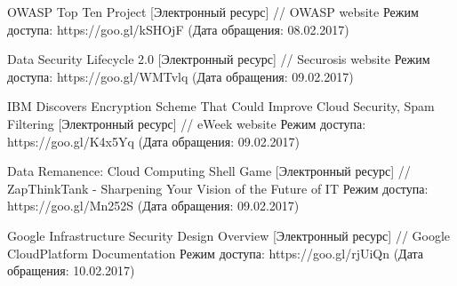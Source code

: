 \begin{thebibliography}{00}
    OWASP Top Ten Project
    [Электронный ресурс] //
    OWASP website
    Режим доступа: https://goo.gl/kSHOjF
    (Дата обращения: 08.02.2017)

    Data Security Lifecycle 2.0
    [Электронный ресурс] //
    Securosis website
    Режим доступа: https://goo.gl/WMTvlq
    (Дата обращения: 09.02.2017)

    IBM Discovers Encryption Scheme That Could Improve Cloud Security, Spam Filtering
    [Электронный ресурс] //
    eWeek website
    Режим доступа: https://goo.gl/K4x5Yq
    (Дата обращения: 09.02.2017)

    Data Remanence: Cloud Computing Shell Game
    [Электронный ресурс] //
    ZapThinkTank - Sharpening Your Vision of the Future of IT
    Режим доступа: https://goo.gl/Mn252S
    (Дата обращения: 09.02.2017)

    Google Infrastructure Security Design Overview
    [Электронный ресурс] //
    Google CloudPlatform Documentation
    Режим доступа: https://goo.gl/rjUiQn
    (Дата обращения: 10.02.2017)

\end{thebibliography}
\endgroup

\clearpage
